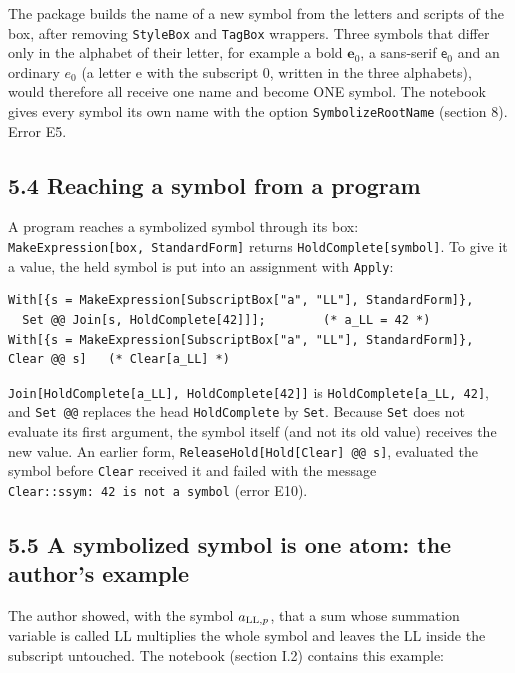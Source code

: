 \documentclass[
  10pt,
]{article}
\begin{document}
The package builds the name of a new symbol from the letters and scripts
of the box, after removing \texttt{StyleBox} and \texttt{TagBox}
wrappers. Three symbols that differ only in the alphabet of their
letter, for example a bold \(\mathbf e_0\), a sans-serif \(\mathsf e_0\)
and an ordinary \(e_0\) (a letter e with the subscript 0, written in the
three alphabets), would therefore all receive one name and become ONE
symbol. The notebook gives every symbol its own name with the option
\texttt{SymbolizeRootName} (section 8). Error E5.

\hypertarget{reaching-a-symbol-from-a-program}{%
\subsection{5.4 Reaching a symbol from a
program}\label{reaching-a-symbol-from-a-program}}

A program reaches a symbolized symbol through its box:
\texttt{MakeExpression{[}box,\ StandardForm{]}} returns
\texttt{HoldComplete{[}symbol{]}}. To give it a value, the held symbol
is put into an assignment with \texttt{Apply}:

\begin{verbatim}
With[{s = MakeExpression[SubscriptBox["a", "LL"], StandardForm]},
  Set @@ Join[s, HoldComplete[42]]];        (* a_LL = 42 *)
With[{s = MakeExpression[SubscriptBox["a", "LL"], StandardForm]}, Clear @@ s]   (* Clear[a_LL] *)
\end{verbatim}

\texttt{Join{[}HoldComplete{[}a\_LL{]},\ HoldComplete{[}42{]}{]}} is
\texttt{HoldComplete{[}a\_LL,\ 42{]}}, and \texttt{Set\ @@} replaces the
head \texttt{HoldComplete} by \texttt{Set}. Because \texttt{Set} does
not evaluate its first argument, the symbol itself (and not its old
value) receives the new value. An earlier form,
\texttt{ReleaseHold{[}Hold{[}Clear{]}\ @@\ s{]}}, evaluated the symbol
before \texttt{Clear} received it and failed with the message
\texttt{Clear::ssym:\ 42\ is\ not\ a\ symbol} (error E10).

\hypertarget{a-symbolized-symbol-is-one-atom-the-authors-example}{%
\subsection{5.5 A symbolized symbol is one atom: the author's
example}\label{a-symbolized-symbol-is-one-atom-the-authors-example}}

The author showed, with the symbol \(a_{{\rm LL},p}\), that a sum whose
summation variable is called LL multiplies the whole symbol and leaves
the LL inside the subscript untouched. The notebook (section I.2)
contains this example:
\end{document}
